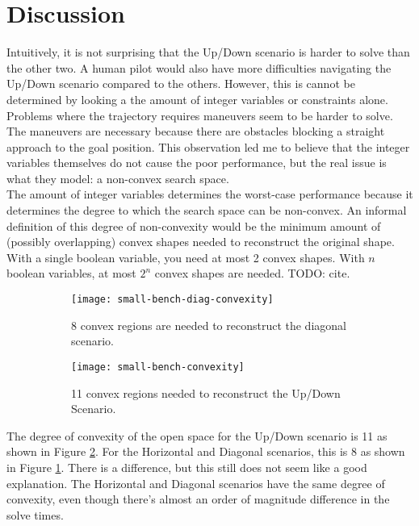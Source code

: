 \section{Discussion}
\label{subsec:naive-discussion}
Intuitively, it is not surprising that the Up/Down scenario is harder to solve than the other two. A human pilot would also have more difficulties navigating the Up/Down scenario compared to the others. However, this is cannot be determined by looking a the amount of integer variables or constraints alone.\\
Problems where the trajectory requires maneuvers seem to be harder to solve. The maneuvers are necessary because there are obstacles blocking a straight approach to the goal position. This observation led me to believe that the integer variables themselves do not cause the poor performance, but the real issue is what they model: a non-convex search space.\\
The amount of integer variables determines the worst-case performance because it determines the degree to which the search space can be non-convex. An informal definition of this degree of non-convexity would be the minimum amount of (possibly overlapping) convex shapes needed to reconstruct the original shape. With a single boolean variable, you need at most 2 convex shapes. With $n$ boolean variables, at most $2^n$ convex shapes are needed. TODO: cite.\\
\begin{figure}
	\centering
	\begin{subfigure}[t]{0.47\columnwidth}
        		\texttt{[image: small-bench-diag-convexity]}
        		\caption{8 convex regions are needed to reconstruct the diagonal scenario.}
        		 \label{fig:convex-diag-convexity}
	\end{subfigure}	
	\hfill
	\begin{subfigure}[t]{0.47\columnwidth}
        		\texttt{[image: small-bench-convexity]}
        		\caption{11 convex regions needed to reconstruct the Up/Down Scenario.}
        		 \label{fig:convex-full-convexity}
	\end{subfigure}	
    \caption{}
    \label{fig:benchmarks-convex}     
\end{figure}
The degree of convexity of the open space for the Up/Down scenario is 11 as shown in Figure \ref{fig:convex-full-convexity}. For the Horizontal and Diagonal scenarios, this is 8 as shown in Figure \ref{fig:convex-diag-convexity}. There is a difference, but this still does not seem like a good explanation. The Horizontal and Diagonal scenarios have the same degree of convexity, even though there's almost an order of magnitude difference in the solve times. \\
